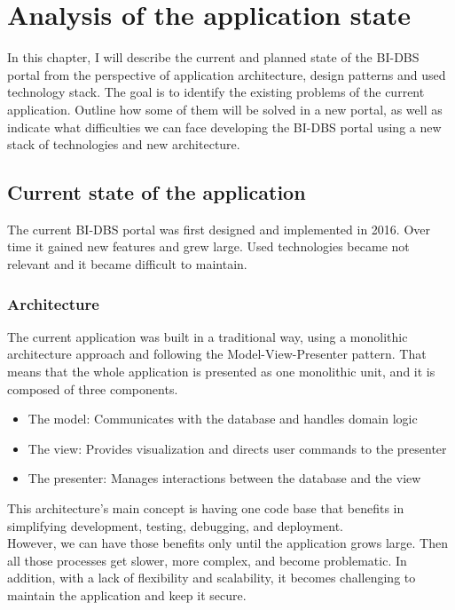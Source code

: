 \chapter{Analysis of the application state}
In this chapter, I will describe the current and planned state of the BI-DBS portal from the perspective of application architecture, design patterns and used technology stack. The goal is to identify the existing problems of the current application. Outline how some of them will be solved in a new portal, as well as indicate what difficulties we can face developing the BI-DBS portal using a new stack of technologies and new architecture.


\section{Current state of the application}
The current BI-DBS portal was first designed and implemented in 2016. Over time it gained new features and grew large. Used technologies became not relevant and it became difficult to maintain. 

\subsection{Architecture}
The current application was built in a traditional way, using a monolithic architecture approach and following the Model-View-Presenter pattern\cite{potel_mvp}. That means that the whole application is presented as one monolithic unit, and it is composed  of three components.

\begin{itemize}
  \item The model: Communicates with the database and handles domain logic
  \item The view: Provides visualization and directs user commands to the presenter
  \item The presenter: Manages interactions between the database and the view
\end{itemize}

\noindent
This architecture's main concept is having one code base that benefits in simplifying development, testing, debugging, and deployment. \\
However, we can have those benefits only until the application grows large. Then all those processes get slower, more complex, and become problematic. In addition, with a lack of flexibility and scalability, it becomes challenging to maintain the application and keep it secure. \\

